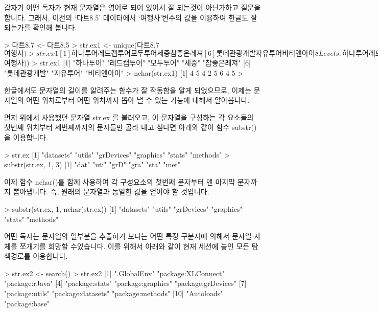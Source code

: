 갑자기 어떤 독자가 현재 문자열은 영어로 되어 있어서 잘 되는것이 아닌가하고 질문을 합니다. 
그래서, 이전의 `다트8.5' 데이터에서 `여행사'변수의 값을 이용하여 한글도 잘 되는가를 확인해 봅니다.

\begin{Schunk}
\begin{Soutput} 
> 다트8.7 <- 다트8.5
> str.ex1 <- unique(다트8.7$여행사)
> str.ex1
[1] 하나투어     레드캡투어   모두투어     세중         참좋은레져  
[6] 롯데관광개발 자유투어     비티앤아이  
8 Levels: 하나투어 레드캡투어 모두투어 세중 참좋은레져 ... 비티앤아이
>
> str.ex1 <- as.character(unique(다트8.7$여행사))
> str.ex1
[1] "하나투어"     "레드캡투어"   "모두투어"     "세중"         "참좋은레져"  
[6] "롯데관광개발" "자유투어"     "비티앤아이"  
> nchar(str.ex1)
[1] 4 5 4 2 5 6 4 5
>
\end{Soutput}
\end{Schunk}

한글에서도 문자열의 길이를 알려주는 함수가 잘 작동함을 알게 되었으므로, 이제는 문자열의 어떤 위치로부터 어떤 위치까지 뽑아 낼 수 있는 기능에 대해서 알아봅니다.

먼저 위에서 사용했던 문자열 str.ex 를 불러오고, 이 문자열을 구성하는 각 요소들의 첫번째 위치부터 세번째까지의 문자들만 골라 내고 싶다면 아래와 같이 함수 substr()을 이용합니다.

\begin{Schunk}
\begin{Soutput} 
> str.ex
[1] "datasets"  "utils"     "grDevices" "graphics"  "stats"     "methods"  
> substr(str.ex, 1, 3)
[1] "dat" "uti" "grD" "gra" "sta" "met"
\end{Soutput}
\end{Schunk}

이제 함수 nchar()를 함께 사용하여 각 구성요소의 첫번째 문자부터 맨 마지막 문자까지 뽑아냅니다. 
즉, 원래의 문자열과 동일한 값을 얻어야 할 것입니다. 

\begin{Schunk}
\begin{Soutput} 
> substr(str.ex, 1, nchar(str.ex))
[1] "datasets"  "utils"     "grDevices" "graphics"  "stats"     "methods"  
\end{Soutput}
\end{Schunk}

어떤 독자는 문자열의 일부분을 추출하기 보다는 어떤 특정 구분자에 의해서 문자열 자체를 쪼개기를 희망할 수있습니다. 
이를 위해서 아래와 같이 현재 세션에 놓인 모든 탐색경로를 이용합니다. 

\begin{Schunk}
\begin{Soutput} 
> str.ex2 <- search()
> str.ex2
 [1] ".GlobalEnv"        "package:XLConnect" "package:rJava"    
 [4] "package:stats"     "package:graphics"  "package:grDevices"
 [7] "package:utils"     "package:datasets"  "package:methods"  
[10] "Autoloads"         "package:base"     
\end{Soutput}
\end{Schunk}

